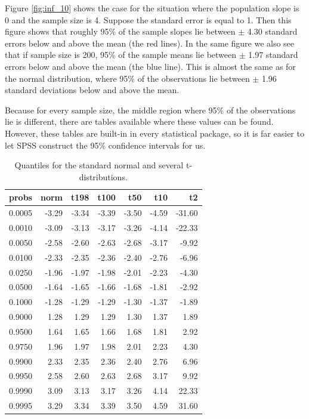 \documentclass[]{book}\usepackage[]{graphicx}\usepackage[]{color}
\begin{document}
Figure \ref{fig:inf_10} shows the case for the situation where the population slope is 0 and the sample size is 4. Suppose the standard error is equal to 1. Then this figure shows that roughly 95\% of the sample slopes lie between $\pm$ 4.30 standard errors below and above the mean (the red lines). In the same figure we also see that if sample size is 200, 95\% of the sample means lie between $\pm$ 1.97 standard errors below and above the mean (the blue line). This is almost the same as for the normal distribution, where 95\% of the observations lie between $\pm$ 1.96 standard deviations below and above the mean.

Because for every sample size, the middle region where 95\% of the observations lie is different, there are tables available where these values can be found. However, these tables are built-in in every statistical package, so it is far easier to let SPSS construct the 95\% confidence intervals for us.


\begin{table}[ht]
\centering
\caption{Quantiles for the standard normal and several t-distributions.} 
\label{tab:table_1}
\begin{tabular}{rrrrrrr}
  \hline
probs & norm & t198 & t100 & t50 & t10 & t2 \\ 
  \hline
0.0005 & -3.29 & -3.34 & -3.39 & -3.50 & -4.59 & -31.60 \\ 
  0.0010 & -3.09 & -3.13 & -3.17 & -3.26 & -4.14 & -22.33 \\ 
  0.0050 & -2.58 & -2.60 & -2.63 & -2.68 & -3.17 & -9.92 \\ 
  0.0100 & -2.33 & -2.35 & -2.36 & -2.40 & -2.76 & -6.96 \\ 
  0.0250 & -1.96 & -1.97 & -1.98 & -2.01 & -2.23 & -4.30 \\ 
  0.0500 & -1.64 & -1.65 & -1.66 & -1.68 & -1.81 & -2.92 \\ 
  0.1000 & -1.28 & -1.29 & -1.29 & -1.30 & -1.37 & -1.89 \\ 
  0.9000 & 1.28 & 1.29 & 1.29 & 1.30 & 1.37 & 1.89 \\ 
  0.9500 & 1.64 & 1.65 & 1.66 & 1.68 & 1.81 & 2.92 \\ 
  0.9750 & 1.96 & 1.97 & 1.98 & 2.01 & 2.23 & 4.30 \\ 
  0.9900 & 2.33 & 2.35 & 2.36 & 2.40 & 2.76 & 6.96 \\ 
  0.9950 & 2.58 & 2.60 & 2.63 & 2.68 & 3.17 & 9.92 \\ 
  0.9990 & 3.09 & 3.13 & 3.17 & 3.26 & 4.14 & 22.33 \\ 
  0.9995 & 3.29 & 3.34 & 3.39 & 3.50 & 4.59 & 31.60 \\ 
   \hline
\end{tabular}
\end{table}
\end{document}
